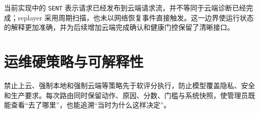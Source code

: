 当前实现中的 \texttt{SENT} 表示请求已经发布到云端请求流，并不等同于云端诊断已经完成；replayer 采用周期扫描，也未以网络恢复事件直接触发。这一边界使运行状态的解释更加准确，并为后续增加云端完成确认和健康门控保留了清晰接口。

\section{运维硬策略与可解释性}
禁止上云、强制本地和强制云端等策略先于软评分执行，防止模型覆盖隐私、安全和生产要求。每次路由同时保留动作、原因、分数、门槛与系统快照，使管理员既能查看“去了哪里”，也能追溯“当时为什么这样决定”。
